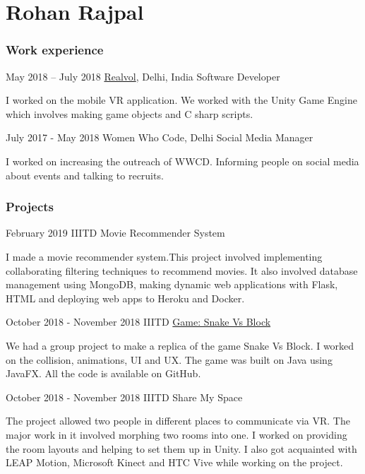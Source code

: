 \documentclass{tccv}
\begin{document}
\part{Rohan Rajpal}

\section{Work experience}

\begin{eventlist}
    
\item{May 2018 -- July 2018}
     {\href{https://realvol.in/}{Realvol}, Delhi, India}
     {Software Developer}

    I worked on the mobile VR application. We worked with the Unity Game Engine which involves making game objects and C sharp scripts.

\item{July 2017 - May 2018}
     {Women Who Code, Delhi}
     {Social Media Manager}
     
      I worked on increasing the outreach of WWCD. Informing people on social media about events and talking to recruits.
      
      
\section{Projects}
\item{February 2019}
    {IIITD}
    {Movie Recommender System}
    
    I made a movie recommender system.This project involved implementing collaborating filtering techniques to recommend movies. It also involved database management using MongoDB, making dynamic web applications with Flask, HTML and deploying web apps to Heroku and Docker.

\item{October 2018 - November 2018}
    {IIITD}
    {\href{https://docs.google.com/presentation/d/1kuuXjSpsZCvphLWA3AERzbiuz_m70CpEDbWSMaA2VZU/edit?usp=sharing}{Game: Snake Vs Block}}
    
    We had a group project to make a replica of the game Snake Vs Block. I worked on the collision, animations, UI and UX. The game was built on Java using JavaFX. All the code is available on GitHub.
    
\item{October 2018 - November 2018}
    {IIITD}
    {Share My Space}
    
    The project allowed two people in different places to communicate via VR. The major work in it involved morphing two rooms into one. I worked on providing the room layouts and helping to set them up in Unity. I also got acquainted with LEAP Motion, Microsoft Kinect and HTC Vive while working on the project.
    

\end{eventlist}
\end{document}
